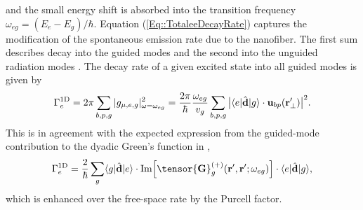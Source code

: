 \documentclass[preprint, aps,pra,onecolumn]{revtex4-1} %
\newcommand{\oneD}{{\rm 1D}}
\begin{document}
and the small energy shift is absorbed into the transition frequency $\omega_{eg} = (E_e - E_g)/\hbar$.  
Equation (\ref{Eq::TotaleeDecayRate}) captures the modification of the spontaneous emission rate due to the nanofiber.  
The first sum describes decay into the guided modes and the second into the unguided radiation modes \cite{ nha_cavity_1997,klimov_spontaneous_2004,le_kien_spontaneous_2005,maslov_distribution_2006, scheel_directional_2015}. The decay rate of a given excited state into all guided modes is given by
	\begin{equation}
		\Gamma_e^{\oneD}= 2\pi \sum_{b,p,g} |g_{\mu,e,g} |^2_{\omega = \omega_{eg}} =  \frac{ 2\pi }{\hbar} \frac{ \omega_{eg} }{v_g} \sum_{b,p,g} \big|\bra{e}\hat{\mathbf{d}}\ket{g} \cdot \mathbf{u}_{bp}(\br'_\perp)\big|^2  .
	\end{equation}
This is in agreement with the expected expression from the guided-mode contribution to the dyadic Green's function in ,
	\begin{equation} \label{Eq::Gamma1DGreens}
		\Gamma_e^{\oneD} =  \frac{2}{\hbar} \sum_{g}  \bra{g}\hat{\mathbf{d}}\ket{e}\cdot 
{\rm Im} \Big[\tensor{\mathbf{G}}^{(+)}_g(\br', \br'; \omega_{eg} ) \Big] \cdot \bra{e}\hat{\mathbf{d}}\ket{g},
	\end{equation}
which is enhanced over the free-space rate by the Purcell factor. 
\end{document}
